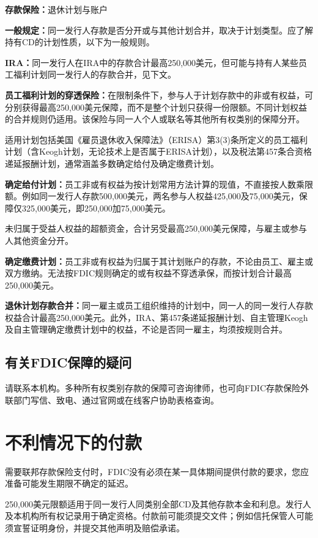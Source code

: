 \documentclass[UTF8,fontset=none,11pt,a4paper]{ctexart}
\begin{document}
\textbf{存款保险：}退休计\allowbreak\mbox{划与账户}


\textbf{一般规定：}同一发行人存款是否分开或与其他计划合并，取决于计划类型。应了解持有CD的计划性质，以下为\allowbreak\mbox{一般规则。}


\textbf{IRA：}同一发行人在IRA中的存款合计最高250,000美元，但可能与持有人某些员工福利计划同一发行人的存款合并，见下文。


\textbf{员工福利计划的穿透保险：}在限制条件下，参与人于计划存款中的非或有权益，可分别获得最高250,000美元保障，而不是整个计划只获得一份限额。不同计划权益的合并规则仍适用。该保险与同一人个人或联名等其他所有权类别的\allowbreak\mbox{保障分开。}


适用计划包括美国《雇员退休收入保障法》（ERISA）第3(3)条所定义的员工福利计划（含Keogh计划，无论技术上是否属于ERISA计划），以及税法第457条合资格递延报酬计划，通常涵盖多数确定给付及确定缴\allowbreak\mbox{费计划。}


\textbf{确定给付计划：}员工非或有权益为按计划常用方法计算的现值，不直接按人数乘限额。例如同一发行人存款500,000美元，两名参与人权益425,000及75,000美元，保障仅325,000美元，即250,000加75,000美元。


未归属于受益人权益的超额资金，合计另受最高250,000美元保障，与雇主或参与人其他\allowbreak\mbox{资金分开。}


\textbf{确定缴费计划：}员工非或有权益为归属于其计划账户的存款，不论由员工、雇主或双方缴纳。无法按FDIC规则确定的或有权益不穿透承保，而按计划合计最高\allowbreak\mbox{250,000美元。}


\textbf{退休计划存款合并：}同一雇主或员工组织维持的计划中，同一人的同一发行人存款权益合计最高250,000美元。此外，IRA、第457条递延报酬计划、自主管理Keogh及自主管理确定缴费计划中的权益，不论是否同一雇主，均须按\allowbreak\mbox{规则合并。}


\subsection*{有关FDIC保障的疑问}
请联系本机构。多种所有权类别存款的保障可咨询律师，也可向FDIC存款保险外联部门写信、致电、通过官网或在线客户协助\allowbreak\mbox{表格查询。}


\section*{不利情况下的付款}
需要联邦存款保险支付时，FDIC没有必须在某一具体期间提供付款的要求，您应准备可能发生期限不确\allowbreak\mbox{定的延迟。}


250,000美元限额适用于同一发行人同类别全部CD及其他存款本金和利息。发行人及本机构所有权记录用于确定资格。付款前可能须提交文件；例如信托保管人可能须宣誓证明身份，并提交其他声明及\allowbreak\mbox{赔偿承诺。}
\end{document}
